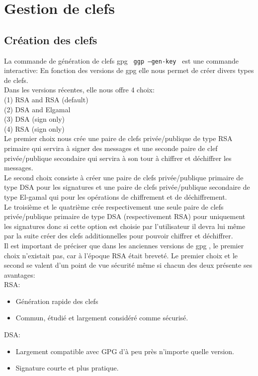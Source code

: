 
\section{Gestion de clefs}
\subsection{Création des clefs}

La commande de génération de clefs gpg  \texttt{ ggp --gen-key } est une commande interactive:
En fonction des versions de gpg elle nous permet de créer divers types de clefs.\\
Dans les versions récentes, elle nous offre 4 choix:\\
   (1) RSA and RSA (default)\\
   (2) DSA and Elgamal\\
   (3) DSA (sign only)\\
   (4) RSA (sign only)\\
   
Le premier choix nous crée une paire de clefs privée/publique de type RSA primaire qui servira à signer des messages et une seconde 
paire de clef privée/publique secondaire qui servira à son tour à chiffrer et déchiffrer les messages.\\
Le second choix consiste à créer une paire de clefs privée/publique primaire de type DSA pour les signatures et une paire de clefs 
privée/publique secondaire de type El-gamal qui pour les opérations de chiffrement et de déchiffrement.\\
Le troisième et le quatrième crée respectivement une seule paire de clefs privée/publique primaire de type DSA (respectivement RSA) pour
uniquement les signatures donc si cette option est choisie par l'utilisateur il devra lui même par la suite créer des clefs additionnelles 
pour pouvoir chiffrer et déchiffrer.\\

Il est important de préciser que dans les anciennes versions de gpg , le premier choix n’existait pas, car à l'époque RSA
était breveté.
Le premier choix et le second se valent d’un point de vue sécurité même si chacun des deux présente ses avantages:\\
RSA:\\ 
\begin{itemize}
\item Génération rapide des clefs
\item Commun, étudié et largement considéré comme sécurisé.
\end{itemize}
DSA:\\
\begin{itemize}
\item Largement compatible avec GPG d'à peu près n’importe quelle version. 
\item Signature courte et plus pratique.
\end{itemize}

